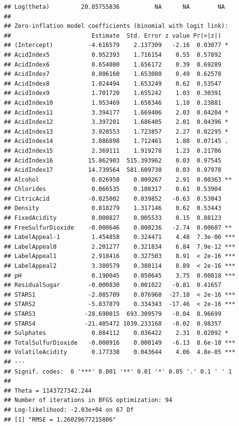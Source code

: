 \documentclass[]{article}
\begin{document}
\begin{verbatim}
## Log(theta)         20.85755836          NA      NA        NA    
## 
## Zero-inflation model coefficients (binomial with logit link):
##                       Estimate  Std. Error z value Pr(>|z|)    
## (Intercept)          -4.616579    2.137309   -2.16  0.03077 *  
## AcidIndex5            0.952393    1.716154    0.55  0.57892    
## AcidIndex6            0.654080    1.656172    0.39  0.69289    
## AcidIndex7            0.806160    1.653080    0.49  0.62578    
## AcidIndex8            1.024494    1.653249    0.62  0.53547    
## AcidIndex9            1.701720    1.655242    1.03  0.30391    
## AcidIndex10           1.953469    1.658346    1.18  0.23881    
## AcidIndex11           3.394177    1.669406    2.03  0.04204 *  
## AcidIndex12           3.397201    1.686405    2.01  0.04396 *  
## AcidIndex13           3.920553    1.723857    2.27  0.02295 *  
## AcidIndex14           3.086898    1.712461    1.80  0.07145 .  
## AcidIndex15           2.369111    1.919278    1.23  0.21706    
## AcidIndex16          15.862903  515.393962    0.03  0.97545    
## AcidIndex17          14.739564  581.609730    0.03  0.97978    
## Alcohol               0.026950    0.009267    2.91  0.00363 ** 
## Chlorides             0.066535    0.108317    0.61  0.53904    
## CitricAcid           -0.025002    0.039852   -0.63  0.53043    
## Density               0.818279    1.317146    0.62  0.53443    
## FixedAcidity          0.000827    0.005533    0.15  0.88123    
## FreeSulfurDioxide    -0.000646    0.000236   -2.74  0.00607 ** 
## LabelAppeal-1         1.454858    0.324471    4.48  7.3e-06 ***
## LabelAppeal0          2.201277    0.321834    6.84  7.9e-12 ***
## LabelAppeal1          2.918416    0.327503    8.91  < 2e-16 ***
## LabelAppeal2          3.380579    0.380114    8.89  < 2e-16 ***
## pH                    0.190045    0.050645    3.75  0.00018 ***
## ResidualSugar        -0.000830    0.001022   -0.81  0.41657    
## STARS1               -2.085709    0.076960  -27.10  < 2e-16 ***
## STARS2               -5.837879    0.334343  -17.46  < 2e-16 ***
## STARS3              -28.690015  693.309579   -0.04  0.96699    
## STARS4              -21.405472 1039.233168   -0.02  0.98357    
## Sulphates             0.084112    0.036422    2.31  0.02092 *  
## TotalSulfurDioxide   -0.000916    0.000149   -6.13  8.6e-10 ***
## VolatileAcidity       0.177338    0.043644    4.06  4.8e-05 ***
## ---
## Signif. codes:  0 '***' 0.001 '**' 0.01 '*' 0.05 '.' 0.1 ' ' 1 
## 
## Theta = 1143727342.244 
## Number of iterations in BFGS optimization: 94 
## Log-likelihood: -2.03e+04 on 67 Df
## [1] "RMSE = 1.26029677215806"
\end{verbatim}
\end{document}
